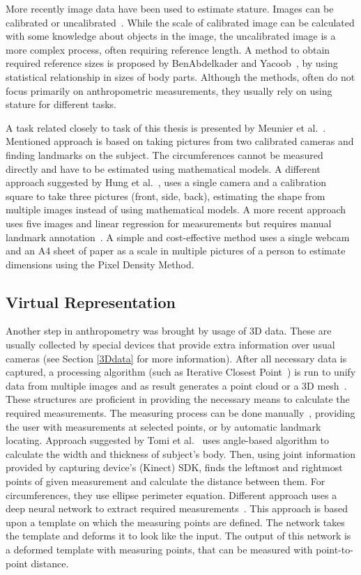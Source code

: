 More recently image data have been used to estimate stature. Images can be calibrated or uncalibrated~\cite{estimationImages, image}. While the scale of calibrated image can be calculated with some knowledge about objects in the image, the uncalibrated image is a more complex process, often requiring reference length. A method to obtain required reference sizes is  proposed by BenAbdelkader and Yacoob~\cite{estimationImages}, by using statistical relationship in sizes of body parts. Although the methods, often do not focus primarily on anthropometric measurements, they usually rely on using stature for different tasks. 

A task related closely to task of this thesis is presented by Meunier et al.~\cite{image2DMeasurements}. Mentioned approach is based on taking pictures from two calibrated cameras and finding landmarks on the subject. The circumferences cannot be measured directly and have to be estimated using mathematical models. A different approach suggested by Hung et al.~\cite{image2DMeasurements2}, uses a single camera and a calibration square to take three pictures (front, side, back), estimating the shape from multiple images instead of using mathematical models. A more recent approach uses five images and linear regression for measurements but requires manual landmark annotation~\cite{images}.  A simple and cost-effective method uses a single webcam and an A4 sheet of paper as a scale in multiple pictures of a person to estimate dimensions using the Pixel Density Method.

\subsection{Virtual Representation}
Another step in anthropometry was brought by usage of 3D data. These are usually collected by special devices that provide extra information over usual cameras (see Section \ref{3Ddata} for more information). After all necessary data is captured, a processing algorithm (such as Iterative Closest Point~\cite{pointcloudProcess}) is run to unify data from multiple images and as result generates a point cloud or a 3D mesh~\cite{digitalAnthro}. These structures are proficient in providing the necessary means to calculate the required measurements. The measuring process can be done manually~\cite{3Dextraction}, providing the user with measurements at selected points, or by automatic landmark locating. Approach suggested by Tomi et al.~\cite{kinect} uses angle-based algorithm to calculate the width and thickness of subject's body. Then, using joint information provided by capturing device's (Kinect) SDK, finds the leftmost and rightmost points of given measurement and calculate the distance between them. For circumferences, they use ellipse perimeter equation. Different approach uses a deep neural network to extract required measurements~\cite{pointcloudNN}. This approach is based upon a template on which the measuring points are defined. The network takes the template and deforms it to look like the input. The output of this network is a deformed template with measuring points, that can be measured with point-to-point distance.


